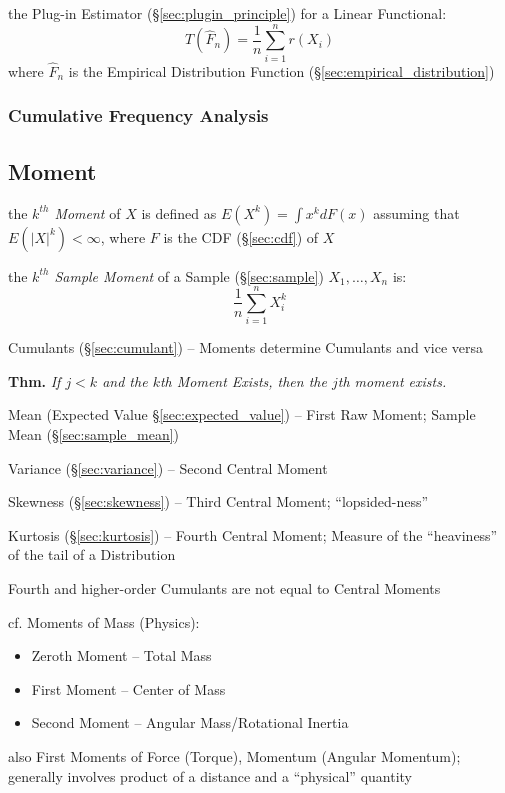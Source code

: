 the Plug-in Estimator (\S\ref{sec:plugin_principle}) for a Linear Functional:
\[
  T(\hat{F}_n) = \frac{1}{n}\sum_{i=1}^n r(X_i)
\]
where $\hat{F}_n$ is the Empirical Distribution Function
(\S\ref{sec:empirical_distribution})



\subsubsection{Cumulative Frequency Analysis}
\label{sec:cumulative_frequency_analysis}



\subsection{Moment}\label{sec:moment}

the \emph{$k^{th}$ Moment} of $X$ is defined as $E(X^k) = \int x^k dF(x)$
assuming that $E(|X|^k) < \infty$, where $F$ is the CDF (\S\ref{sec:cdf}) of $X$

the \emph{$k^{th}$ Sample Moment} of a Sample (\S\ref{sec:sample})
$X_1, \ldots, X_n$ is:
\[
  \frac{1}{n}\sum_{i=1}^n X^k_{i}
\]

\fist Cumulants (\S\ref{sec:cumulant}) -- Moments determine Cumulants and vice
versa

\textbf{Thm.} \emph{If $j < k$ and the $k$th Moment Exists, then the $j$th
  moment exists.}

Mean (Expected Value \S\ref{sec:expected_value}) -- First Raw Moment; Sample
Mean (\S\ref{sec:sample_mean})

Variance (\S\ref{sec:variance}) -- Second Central Moment

Skewness (\S\ref{sec:skewness}) -- Third Central Moment; ``lopsided-ness''

Kurtosis (\S\ref{sec:kurtosis}) -- Fourth Central Moment; Measure of the
``heaviness'' of the tail of a Distribution

Fourth and higher-order Cumulants are not equal to Central Moments

cf. Moments of Mass (Physics):
\begin{itemize}
  \item Zeroth Moment -- Total Mass
  \item First Moment -- Center of Mass
  \item Second Moment -- Angular Mass/Rotational Inertia
\end{itemize}
also First Moments of Force (Torque), Momentum (Angular Momentum); generally
involves product of a distance and a ``physical'' quantity

